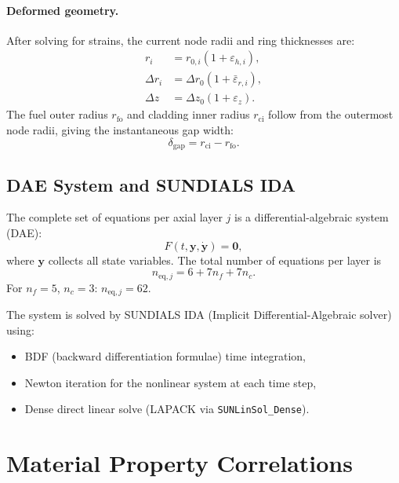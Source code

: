 \documentclass[11pt,a4paper]{article}
\begin{document}
\paragraph{Deformed geometry.}  After solving for strains, the current node
radii and ring thicknesses are:
\begin{align}
  r_i &= r_{0,i}(1 + \varepsilon_{h,i}),\\
  \Delta r_i &= \Delta r_0 (1 + \bar{\varepsilon}_{r,i}),\\
  \Delta z &= \Delta z_0 (1 + \varepsilon_z).
\end{align}
The fuel outer radius $r_{\mathrm{fo}}$ and cladding inner radius
$r_{\mathrm{ci}}$ follow from the outermost node radii, giving the
instantaneous gap width:
\begin{equation}
  \delta_{\mathrm{gap}} = r_{\mathrm{ci}} - r_{\mathrm{fo}}.
\end{equation}

\subsection{DAE System and SUNDIALS IDA}

The complete set of equations per axial layer $j$ is a
differential-algebraic system (DAE):
\begin{equation}
  F(t, \mathbf{y}, \dot{\mathbf{y}}) = \mathbf{0},
\end{equation}
where $\mathbf{y}$ collects all state variables.  The total number of
equations per layer is
\begin{equation}
  n_{\mathrm{eq},j} = 6 + 7 n_f + 7 n_c.
\end{equation}
For $n_f=5$, $n_c=3$: $n_{\mathrm{eq},j} = 62$.

The system is solved by SUNDIALS IDA (Implicit Differential-Algebraic solver)
using:
\begin{itemize}
  \item BDF (backward differentiation formulae) time integration,
  \item Newton iteration for the nonlinear system at each time step,
  \item Dense direct linear solve (LAPACK via \texttt{SUNLinSol\_Dense}).
\end{itemize}

\section{Material Property Correlations}
\end{document}
